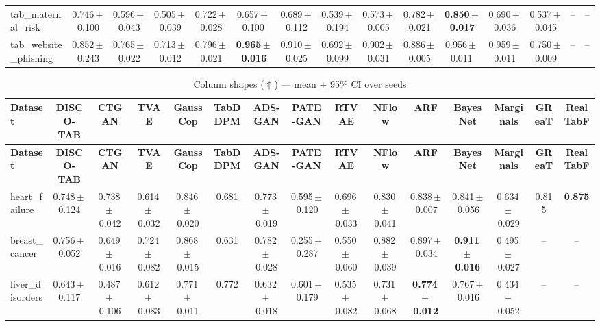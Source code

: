 \documentclass[8pt]{extarticle}
\begin{document}
\begin{longtable}{l*{14}{c}}
tab\_maternal\_risk & 0.746\,$\pm$\,0.100 & 0.596\,$\pm$\,0.043 & 0.505\,$\pm$\,0.039 & 0.722\,$\pm$\,0.028 & 0.657\,$\pm$\,0.100 & 0.689\,$\pm$\,0.112 & 0.539\,$\pm$\,0.194 & 0.573\,$\pm$\,0.005 & 0.782\,$\pm$\,0.021 & \textbf{0.850\,$\pm$\,0.017} & 0.690\,$\pm$\,0.036 & 0.537\,$\pm$\,0.045 & -- & -- \\
tab\_website\_phishing & 0.852\,$\pm$\,0.243 & 0.765\,$\pm$\,0.022 & 0.713\,$\pm$\,0.012 & 0.796\,$\pm$\,0.021 & \textbf{0.965\,$\pm$\,0.016} & 0.910\,$\pm$\,0.025 & 0.692\,$\pm$\,0.099 & 0.902\,$\pm$\,0.031 & 0.886\,$\pm$\,0.005 & 0.956\,$\pm$\,0.011 & 0.959\,$\pm$\,0.011 & 0.750\,$\pm$\,0.009 & -- & -- \\
\end{longtable}
\begin{longtable}{l*{14}{c}}
\caption{Column shapes ($\uparrow$) --- mean $\pm$ 95\% CI over seeds}\\
\toprule
\textbf{Dataset} & \textbf{DISCO-TAB} & \textbf{CTGAN} & \textbf{TVAE} & \textbf{GaussCop} & \textbf{TabDDPM} & \textbf{ADS-GAN} & \textbf{PATE-GAN} & \textbf{RTVAE} & \textbf{NFlow} & \textbf{ARF} & \textbf{BayesNet} & \textbf{Marginals} & \textbf{GReaT} & \textbf{RealTabF} \\
\midrule
\endfirsthead
\toprule
\textbf{Dataset} & \textbf{DISCO-TAB} & \textbf{CTGAN} & \textbf{TVAE} & \textbf{GaussCop} & \textbf{TabDDPM} & \textbf{ADS-GAN} & \textbf{PATE-GAN} & \textbf{RTVAE} & \textbf{NFlow} & \textbf{ARF} & \textbf{BayesNet} & \textbf{Marginals} & \textbf{GReaT} & \textbf{RealTabF} \\
\midrule
\endhead
\bottomrule
\endfoot
heart\_failure & 0.748\,$\pm$\,0.124 & 0.738\,$\pm$\,0.042 & 0.614\,$\pm$\,0.032 & 0.846\,$\pm$\,0.020 & 0.681 & 0.773\,$\pm$\,0.019 & 0.595\,$\pm$\,0.120 & 0.696\,$\pm$\,0.033 & 0.830\,$\pm$\,0.041 & 0.838\,$\pm$\,0.007 & 0.841\,$\pm$\,0.056 & 0.634\,$\pm$\,0.029 & 0.815 & \textbf{0.875} \\
breast\_cancer & 0.756\,$\pm$\,0.052 & 0.649\,$\pm$\,0.016 & 0.724\,$\pm$\,0.082 & 0.868\,$\pm$\,0.015 & 0.631 & 0.782\,$\pm$\,0.028 & 0.255\,$\pm$\,0.287 & 0.550\,$\pm$\,0.060 & 0.882\,$\pm$\,0.039 & 0.897\,$\pm$\,0.034 & \textbf{0.911\,$\pm$\,0.016} & 0.495\,$\pm$\,0.027 & -- & -- \\
liver\_disorders & 0.643\,$\pm$\,0.117 & 0.487\,$\pm$\,0.106 & 0.612\,$\pm$\,0.083 & 0.771\,$\pm$\,0.011 & 0.772 & 0.632\,$\pm$\,0.018 & 0.601\,$\pm$\,0.179 & 0.535\,$\pm$\,0.082 & 0.731\,$\pm$\,0.068 & \textbf{0.774\,$\pm$\,0.012} & 0.767\,$\pm$\,0.016 & 0.434\,$\pm$\,0.052 & -- & -- \\

\end{longtable}
\end{document}
